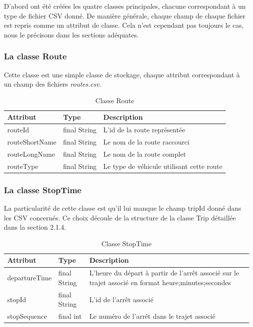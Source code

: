 \documentclass[12pt]{article}
\begin{document}
D'abord ont été créées les quatre classes principales, chacune correspondant à un type de fichier CSV donné. De manière générale, 
chaque champ de chaque fichier est repris comme un attribut de classe. Cela n'est cependant pas toujours le cas, nous le précisons
dans les sections adéquates.

\subsubsection{La classe Route}
Cette classe est une simple classe de stockage, chaque attribut correspondant à un champ des fichiers \emph{routes.csv}.

\begin{table}[h]
    \centering
    \begin{tabular}{|l|l|p{8cm}|}
    \hline
    \textbf{Attribut} & \textbf{Type} & \textbf{Description} \\
    \hline
    routeId & final String & L'id de la route représentée \\
    routeShortName & final String & Le nom de la route raccourci \\
    routeLongName & final String & Le nom de la route complet \\
    routeType & final String & Le type de véhicule utilisant cette route \\
    \hline
    \end{tabular}
    \caption{Classe Route}
\end{table}

\subsubsection{La classe StopTime}
La particularité de cette classe est qu'il lui manque le champ tripId donné dans les CSV concernés. Ce choix découle
de la structure de la classe Trip détaillée dans la section 2.1.4. %
\vspace{2cm}
\begin{table}[h]
    \centering
    \begin{tabular}{|l|l|p{8cm}|}
    \hline
    \textbf{Attribut} & \textbf{Type} & \textbf{Description} \\
    \hline
    departureTime & final String & L'heure du départ à partir de
                                   l'arrêt associé sur le trajet associé en format 
                                   heure;minutes;secondes \\
    stopId & final String & L'id de l'arrêt associé \\
    stopSequence & final int & Le numéro de l'arrêt dans le trajet associé \\
    \hline
    \end{tabular}
    \caption{Classe StopTime}
\end{table}
\end{document}
